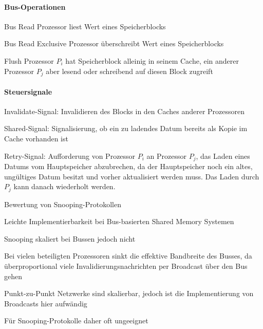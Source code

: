 \documentclass[a4paper]{article}
\begin{document}
\begin{multicols}{3}
  \paragraph{Bus-Operationen}
  \begin{description*}
    \item[Bus Read] Prozessor liest Wert eines Speicherblocks
    \item[Bus Read Exclusive] Prozessor überschreibt Wert eines Speicherblocks
    \item[Flush] Prozessor $P_i$ hat Speicherblock alleinig in seinem Cache, ein anderer Prozessor $P_j$ aber lesend oder schreibend auf diesen Block zugreift
  \end{description*}
  
  \paragraph{Steuersignale}
  \begin{itemize*}
    \item Invalidate-Signal: Invalidieren des Blocks in den Caches anderer Prozessoren
    \item Shared-Signal: Signalisierung, ob ein zu ladendes Datum bereits als Kopie im Cache vorhanden ist
    \item Retry-Signal: Aufforderung von Prozessor $P_i$ an Prozessor $P_j$, das Laden eines Datums vom Hauptspeicher abzubrechen, da der Hauptspeicher noch ein altes, ungültiges Datum besitzt und vorher aktualisiert werden muss. Das Laden durch $P_j$ kann danach wiederholt werden.
  \end{itemize*}
  
  Bewertung von Snooping-Protokollen
  \begin{itemize*}
    \item Leichte Implementierbarkeit bei Bus-basierten Shared Memory Systemen
    \item Snooping skaliert bei Bussen jedoch nicht
    \item Bei vielen beteiligten Prozessoren sinkt die effektive Bandbreite des Busses, da überproportional viele Invalidierungsnachrichten per Broadcast über den Bus gehen
    \item Punkt-zu-Punkt Netzwerke sind skalierbar, jedoch ist die Implementierung von Broadcasts hier aufwändig
    \item Für Snooping-Protokolle daher oft ungeeignet
  \end{itemize*}
  

\end{multicols}
\end{document}
